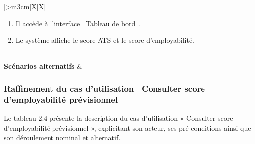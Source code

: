 \begin{table}[H]
\begin{tabularx}{\textwidth}{|>{\bfseries\centering\arraybackslash}m{3cm}|X|X|}
{\begin{minipage}[t]{\linewidth}
\begin{enumerate}[nosep,leftmargin=*]
    \item Il accède à l'interface \guillemotleft~Tableau de bord~\guillemotright.
    \item Le système affiche le score ATS et le score d'employabilité.
  \end{enumerate}
  \vspace{4pt}
  \end{minipage}} \\
\hline
\textbf{Scénarios alternatifs} &  \\
\hline
\end{tabularx}
\end{table}

\subsubsection{Raffinement du cas d'utilisation \guillemotleft~Consulter score d'employabilité prévisionnel~\guillemotright}
\label{sec:uc-consulter-score-prev}
Le tableau 2.4 présente la description du cas d’utilisation « Consulter score d’employabilité prévisionnel », explicitant son acteur, ses pré-conditions ainsi que son déroulement nominal et alternatif. 

